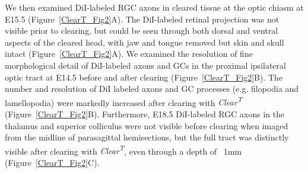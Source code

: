 We then examined DiI-labeled RGC axons in cleared tissue at the optic chiasm at E15.5 (Figure~\ref{ClearT_Fig2}A).
The DiI-labeled retinal projection was not visible prior to clearing, but could be seen through both dorsal and ventral aspects of the cleared head, with jaw and tongue removed but skin and skull intact (Figure~\ref{ClearT_Fig2}A).
We examined the resolution of fine morphological detail of DiI-labeled axons and GCs in the proximal ipsilateral optic tract at E14.5 before and after clearing (Figure~\ref{ClearT_Fig2}B).
The number and resolution of DiI labeled axons and GC processes (e.g. filopodia and lamellopodia) were markedly increased after clearing with \emph{Clear\textsuperscript{T}} (Figure~\ref{ClearT_Fig2}B).
Furthermore, E18.5 DiI-labeled RGC axons in the thalamus and superior colliculus were not visible before clearing when imaged from the midline of parasagittal hemisections, but the full tract was distinctly visible after clearing with \emph{Clear\textsuperscript{T}}, even through a depth of ~1mm (Figure~\ref{ClearT_Fig2}C).
